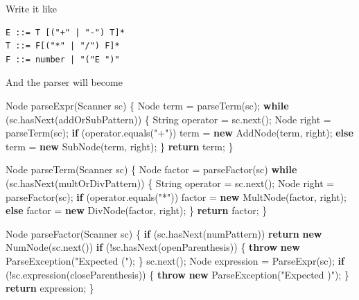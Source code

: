 \documentclass[
]{book}
\newenvironment{Shaded}{\begin{snugshade}}{\end{snugshade}}
\newcommand{\BuiltInTok}[1]{#1}
\newcommand{\FunctionTok}[1]{\textcolor[rgb]{0.00,0.00,0.00}{#1}}
\newcommand{\KeywordTok}[1]{\textcolor[rgb]{0.13,0.29,0.53}{\textbf{#1}}}
\newcommand{\NormalTok}[1]{#1}
\newcommand{\StringTok}[1]{\textcolor[rgb]{0.31,0.60,0.02}{#1}}
\begin{document}
Write it like

\begin{verbatim}
E ::= T [("+" | "-") T]*
T ::= F[("*" | "/") F]*
F ::= number | "("E ")"
\end{verbatim}

And the parser will become

\begin{Shaded}
\begin{Highlighting}[]
\BuiltInTok{Node} \FunctionTok{parseExpr}\NormalTok{(}\BuiltInTok{Scanner}\NormalTok{ sc) \{}
  \BuiltInTok{Node}\NormalTok{ term = }\FunctionTok{parseTerm}\NormalTok{(sc);}
  \KeywordTok{while}\NormalTok{ (sc.}\FunctionTok{hasNext}\NormalTok{(addOrSubPattern)) \{}
    \BuiltInTok{String}\NormalTok{ operator = sc.}\FunctionTok{next}\NormalTok{();}
    \BuiltInTok{Node}\NormalTok{ right = }\FunctionTok{parseTerm}\NormalTok{(sc);}
    \KeywordTok{if}\NormalTok{ (operator.}\FunctionTok{equals}\NormalTok{(}\StringTok{"+"}\NormalTok{))}
\NormalTok{      term = }\KeywordTok{new} \FunctionTok{AddNode}\NormalTok{(term, right);}
    \KeywordTok{else}\NormalTok{ term = }\KeywordTok{new} \FunctionTok{SubNode}\NormalTok{(term, right);}
\NormalTok{  \}}
  \KeywordTok{return}\NormalTok{ term;}
\NormalTok{\}}

\BuiltInTok{Node} \FunctionTok{parseTerm}\NormalTok{(}\BuiltInTok{Scanner}\NormalTok{ sc) \{}
  \BuiltInTok{Node}\NormalTok{ factor = }\FunctionTok{parseFactor}\NormalTok{(sc)}
  \KeywordTok{while}\NormalTok{ (sc.}\FunctionTok{hasNext}\NormalTok{(multOrDivPattern)) \{}
    \BuiltInTok{String}\NormalTok{ operator = sc.}\FunctionTok{next}\NormalTok{();}
    \BuiltInTok{Node}\NormalTok{ right = }\FunctionTok{parseFactor}\NormalTok{(sc);}
    \KeywordTok{if}\NormalTok{ (operator.}\FunctionTok{equals}\NormalTok{(}\StringTok{"*"}\NormalTok{))}
\NormalTok{      factor = }\KeywordTok{new} \FunctionTok{MultNode}\NormalTok{(factor, right);}
    \KeywordTok{else}\NormalTok{ factor = }\KeywordTok{new} \FunctionTok{DivNode}\NormalTok{(factor, right);}
\NormalTok{  \}}
  \KeywordTok{return}\NormalTok{ factor;}
\NormalTok{\}}

\BuiltInTok{Node} \FunctionTok{parseFactor}\NormalTok{(}\BuiltInTok{Scanner}\NormalTok{ sc) \{}
  \KeywordTok{if}\NormalTok{ (sc.}\FunctionTok{hasNext}\NormalTok{(numPattern))}
    \KeywordTok{return} \KeywordTok{new} \FunctionTok{NumNode}\NormalTok{(sc.}\FunctionTok{next}\NormalTok{())}
  \KeywordTok{if}\NormalTok{ (!sc.}\FunctionTok{hasNext}\NormalTok{(openParenthesis)) \{}
    \KeywordTok{throw} \KeywordTok{new} \BuiltInTok{ParseException}\NormalTok{(}\StringTok{"Expected \textquotesingle{}(\textquotesingle{}"}\NormalTok{);}
\NormalTok{  \}}
\NormalTok{  sc.}\FunctionTok{next}\NormalTok{();}
  \BuiltInTok{Node}\NormalTok{ expression = }\FunctionTok{ParseExpr}\NormalTok{(sc);}
  \KeywordTok{if}\NormalTok{ (!sc.}\FunctionTok{expression}\NormalTok{(closeParenthesis)) \{}
    \KeywordTok{throw} \KeywordTok{new} \BuiltInTok{ParseException}\NormalTok{(}\StringTok{"Expected \textquotesingle{})\textquotesingle{}"}\NormalTok{);}
\NormalTok{  \}}
  \KeywordTok{return}\NormalTok{ expression;}
\NormalTok{\}}
\end{Highlighting}
\end{Shaded}
\end{document}

